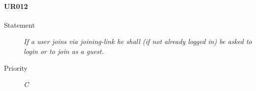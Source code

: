 \paragraph{UR012}
  \begin{description}
  \item [Statement] 
    \textit{ If a user joins via joining-link he shall (if not already logged in) be asked to login or to join as a guest.}
  \item [Priority] \textit{C}
\end{description}